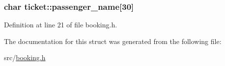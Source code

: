 \hypertarget{structticket_ac52977b4e30a262ba97c8bd1ac6dbdc9}{
\subsubsection[{passenger\+\_\+name}]{\setlength{\rightskip}{0pt plus 5cm}char ticket\+::passenger\+\_\+name\mbox{[}30\mbox{]}}}\label{structticket_ac52977b4e30a262ba97c8bd1ac6dbdc9}


Definition at line 21 of file booking.\+h.



The documentation for this struct was generated from the following file\+:\begin{DoxyCompactItemize}
\item 
src/\hyperlink{booking_8h}{booking.\+h}\end{DoxyCompactItemize}
